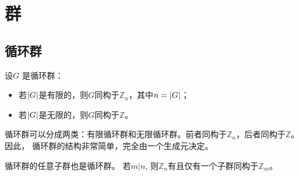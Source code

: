 \chapter{群}






\section{循环群}
\begin{theorem}[循环群的结构]
    设\(G\) 是循环群：
    \begin{itemize}
        \item 若\(\left|G\right|\)是有限的，则\(G\)同构于\(\mathbb{Z}_n\)，其中\(n = \left|G\right|\)；
        \item 若\(\left|G\right|\)是无限的，则\(G\)同构于\(\mathbb{Z}\)。
    \end{itemize}
\end{theorem}
循环群可以分成两类：有限循环群和无限循环群。前者同构于\(\mathbb{Z}_n\)，后者同构于\(\mathbb{Z}\)。因此，
循环群的结构非常简单，完全由一个生成元决定。
\begin{theorem}[循环群子群结构]
    循环群的任意子群也是循环群。
    若\(m|n\), 则\(\mathbb{Z}_n\)有且仅有一个子群同构于\(\mathbb{Z}_m\)。
\end{theorem}



